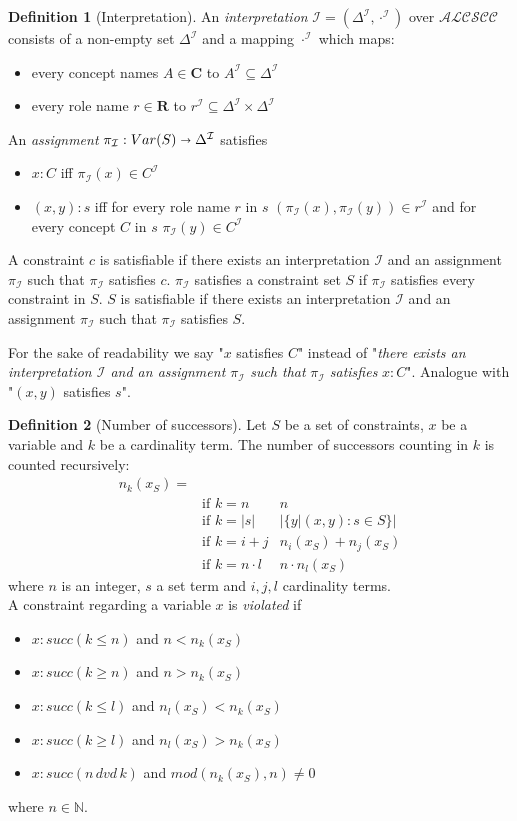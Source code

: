 \documentclass[a4paper,11pt]{scrartcl}
\theoremstyle{break}
\theoremstyle{definition}
\newtheorem{mydef}{Definition}
\begin{document}
\begin{mydef}[Interpretation]
An \textit{interpretation} $\mathcal{I=(\Delta^\mathcal{I},\cdot^\mathcal{I})}$ over $\mathcal{ALCSCC}$ consists of a non-empty set $\Delta^\mathcal{I}$ and a mapping $\cdot^\mathcal{I}$ which maps:
\begin{itemize}
\item every concept names $A\in\mathbf{C}$ to $A^\mathcal{I}\subseteq \Delta^\mathcal{I}$
\item every role name $r\in\mathbf{R}$ to $r^\mathcal{I}\subseteq\Delta^\mathcal{I}\times\Delta^\mathcal{I}$
\end{itemize}
An \textit{assignment} $\pi_\mathcal{I}: Var(S)\shortrightarrow \Delta^\mathcal{I}$ satisfies 
\begin{itemize}
\item $x:C$ iff $\pi_\mathcal{I}(x)\in C^\mathcal{I}$ 
\item $(x,y):s$ iff for every role name $r$ in $s$ $(\pi_\mathcal{I}(x),\pi_\mathcal{I}(y))\in r^\mathcal{I}$ and for every concept $C$ in $s$ $\pi_\mathcal{I}(y)\in C^\mathcal{I}$
\end{itemize} 
A constraint $c$ is satisfiable if there exists an interpretation $\mathcal{I}$ and an assignment $\pi_\mathcal{I}$ such that $\pi_\mathcal{I}$ satisfies $c$. $\pi_\mathcal{I}$ satisfies a constraint set $S$ if $\pi_\mathcal{I}$ satisfies every constraint in $S$. $S$ is satisfiable if there exists an interpretation $\mathcal{I}$ and an assignment $\pi_\mathcal{I}$ such that $\pi_\mathcal{I}$ satisfies $S$.
\end{mydef}
For the sake of readability we say "$x$ satisfies $C$" instead of "\textit{there exists an interpretation $\mathcal{I}$ and an assignment $\pi_\mathcal{I}$ such that }$\pi_\mathcal{I}$ \textit{satisfies} $x:C$". Analogue with "$(x,y)$ satisfies $s$".
\begin{mydef}[Number of successors]
Let $S$ be a set of constraints, $x$ be a variable and $k$ be a cardinality term. The number of successors counting in $k$ is counted recursively:
\begin{align*}
n_k(x_S)=&\quad\quad\quad\quad&\\
&\text{if } k=n&n\\
&\text{if } k=|s|&|\{y|(x,y):s\in S\}|\\
&\text{if } k=i+j&n_i(x_S)+n_j(x_S)\\
&\text{if } k=n\cdot l&n\cdot n_l(x_S)
\end{align*}
where $n$ is an integer, $s$ a set term and $i,j,l$ cardinality terms. \\
A constraint regarding a variable $x$ is \textit{violated} if
\begin{itemize}
\item $x:succ(k\leq n)$ and $n<n_k(x_S)$
\item $x:succ(k\geq n)$ and $n>n_k(x_S)$
\item $x:succ(k\leq l)$ and $n_l(x_S)<n_k(x_S)$
\item $x:succ(k\geq l)$ and $n_l(x_S)>n_k(x_S)$
\item $x:succ(n\,dvd\,k)$ and $mod(n_k(x_S),n)\neq 0$
\end{itemize} 
where $n\in\mathbb{N}$.
\end{mydef}
\end{document}
